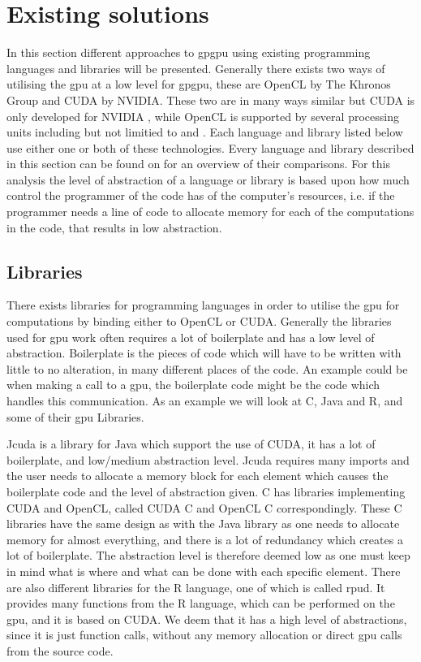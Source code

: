 \section{Existing solutions} %
\label{sec:state_of_the_art}
In this section different approaches to \acrshort{gpgpu} using existing programming languages and libraries will be presented.
Generally there exists two ways of utilising the \acrshort{gpu} at a low level for \acrshort{gpgpu}, these are OpenCL by The Khronos Group and CUDA by NVIDIA.
These two are in many ways similar but CUDA is only developed for NVIDIA , while OpenCL is supported by several processing units including but not limitied to  and .
Each language and library listed below use either one or both of these technologies.
Every language and library described in this section can be found on  for an overview of their comparisons.
For this analysis the level of abstraction of a language or library is based upon how much control the programmer of the code has of the computer's resources, i.e. if the programmer needs a line of code to allocate memory for each of the computations in the code, that results in low abstraction.
      
\subsection{Libraries} 
There exists libraries for programming languages in order to utilise the \acrshort{gpu} for computations by binding either to OpenCL or CUDA.
Generally the libraries used for \acrshort{gpu} work often requires a lot of boilerplate and has a low level of abstraction.
Boilerplate is the pieces of code which will have to be written with little to no alteration, in many different places of the code.
An example could be when making a call to a \acrshort{gpu}, the boilerplate code might be the code which handles this communication.
As an example we will look at C, Java and R, and some of their \acrshort{gpu} Libraries.

Jcuda is a library for Java which support the use of CUDA, it has a lot of boilerplate, and low/medium abstraction level. \citep{Java_library}
Jcuda requires many imports and the user needs to allocate a memory block for each element which causes the boilerplate code and the level of abstraction given. \citep{Java_malloc}
C has libraries implementing CUDA and OpenCL, called CUDA C and OpenCL C correspondingly.
These C libraries have the same design as with the Java library as one needs to allocate memory for almost everything, and there is a lot of redundancy which creates a lot of boilerplate. 
The abstraction level is therefore deemed low as one must keep in mind what is where and what can be done with each specific element. \citep{C_CUDA} 
There are also different libraries for the R language, one of which is called rpud.
It provides many functions from the R language, which can be performed on the \acrshort{gpu}, and it is based on CUDA.
We deem that it has a high level of abstractions, since it is just function calls, without any memory allocation or direct \acrshort{gpu} calls from the source code. \citep{Rcuda} 

